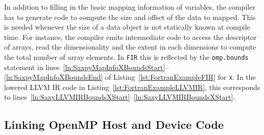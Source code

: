 \documentclass[acmtog,natbib=false]{acmart}
\newcommand{\code}[1]{\texttt{#1}\xspace}
\begin{document}

In addition to filling in the basic mapping information of variables, the compiler has to generate code to compute the size and offset of the data to mapped.
This is needed whenever the size of a data object is not statically known at compile time.
For instance, the compiler emits intermediate code to access the descriptor of arrays, read the dimensionality and the extent in each dimensions to compute the total number of array elements.
In \code{FIR} this is reflected by the \code{omp.bounds} statement in lines~\ref{ln:SaxpyMapInfoXBoundsStart}--\ref{ln:SaxpyMapInfoXBoundsEnd} of Listing~\ref{lst:FortranExampleFIR} for \code{x}.
In the lowered LLVM \ac{IR} code in Listing~\ref{lst:FortranExampleLLVMIR}, this corresponds to lines~\ref{ln:SaxyLLVMIRBoundsXStart}--\ref{ln:SaxyLLVMIRBoundsXStart}.




\subsection{Linking OpenMP Host and Device Code}
\label{sec:LinkingOpenMPHostandDeviceCode}
\end{document}
